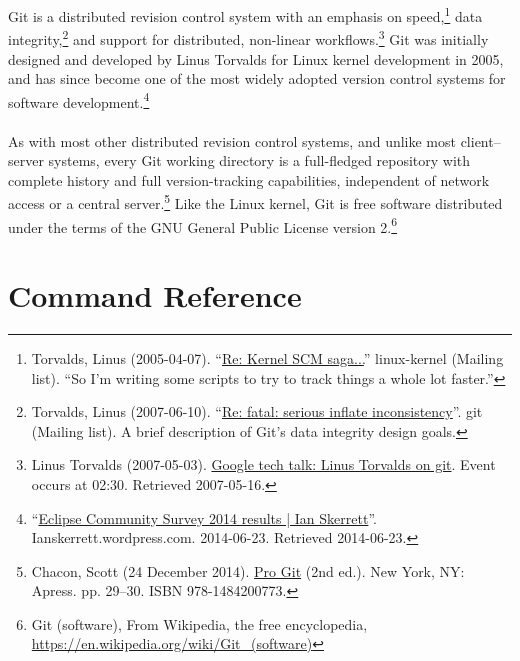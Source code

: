 \documentclass[12pt,letterpaper,dvips]{article}
\begin{document}
Git is a distributed revision control system with an emphasis on
speed,\footnote{ Torvalds, Linus
  (2005-04-07). ``\href{http://marc.info/?l=linux-kernel&m=111288700902396}{Re:
    Kernel SCM saga...}'' linux-kernel (Mailing list). ``So I'm writing some
  scripts to try to track things a whole lot faster.''} data integrity,\footnote{ Torvalds, Linus (2007-06-10). ``\href{http://marc.info/?l=git&m=118143549107708}{Re: fatal: serious inflate inconsistency}''. git (Mailing list). A brief description of Git's data integrity design goals.} and support for distributed, non-linear workflows.\footnote{Linus Torvalds (2007-05-03). \href{https://www.youtube.com/watch?v=4XpnKHJAok8}{Google tech talk: Linus Torvalds on git}. Event occurs at 02:30. Retrieved 2007-05-16.} Git was initially designed and developed by Linus Torvalds for Linux kernel development in 2005, and has since become one of the most widely adopted version control systems for software development.\footnote{ ``\href{http://ianskerrett.wordpress.com/2014/06/23/eclipse-community-survey-2014-results/}{Eclipse Community Survey 2014 results | Ian Skerrett}''. Ianskerrett.wordpress.com. 2014-06-23. Retrieved 2014-06-23.}\\
\\
\noindent As with most other distributed revision control systems,
and unlike most client–server systems, every Git working directory is a
full-fledged repository with complete history and full version-tracking
capabilities, independent of network access or a central
server.\footnote{Chacon, Scott (24
  December 2014). \href{http://git-scm.com/book/en/v2}{Pro Git} (2nd ed.). New
  York, NY: Apress. pp. 29–30. ISBN 978-1484200773.} Like the Linux kernel,
Git is free software distributed under the terms of the GNU General Public
License version 2.\footnote{Git (software), From Wikipedia, the free
encyclopedia, \href{https://en.wikipedia.org/wiki/Git\_(software)}{https://en.wikipedia.org/wiki/Git\_(software)}}


\newpage
\section{Command Reference}
\end{document}
